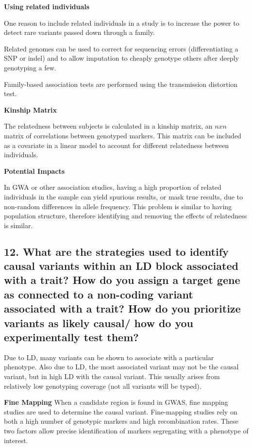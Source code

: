\documentclass{tufte-handout}
\theoremstyle{noparens}
\begin{document}
\noindent
\textbf{Using related individuals}

One reason to include related individuals in a study is to increase the power to detect rare variants passed down through a family. 

Related genomes can be used to correct for sequencing errors (differentiating a SNP or indel) and to allow imputation to cheaply genotype others after deeply genotyping a few.

Family-based association tests are performed using the transmission distortion test. 

\textbf{Kinship Matrix}

The relatedness between subjects is calculated in a kinship matrix, an $nxn$ matrix of correlations between genotyped markers. This matrix can be included as a covariate in a linear model to account for different relatedness between individuals.

\noindent
\textbf{Potential Impacts}

In GWA or other association studies, having a high proportion of related individuals in the sample can yield spurious results, or mask true results, due to non-random differences in allele frequency. This problem is similar to having population structure, therefore identifying and removing the effects of relatedness is similar.

\newpage
\subsection{12. What are the strategies used to identify causal variants within an LD block associated with a trait? How do you assign a target gene as connected to a non-coding variant associated with a trait? How do you prioritize variants as likely causal/ how do you experimentally test them?}

Due to LD, many variants can be shown to associate with a particular phenotype. Also due to LD, the most associated variant may not be the causal variant, but in high LD with the causal variant. This usually arises from relatively low genotyping coverage (not all variants will be typed).

\noindent
\textbf{Fine Mapping}
When a candidate region is found in GWAS, fine mapping studies are used to determine the causal variant. Fine-mapping studies rely on both a high number of genotypic markers and high recombination rates. These two factors allow precise identification of markers segregating with a phenotype of interest.
\end{document}
